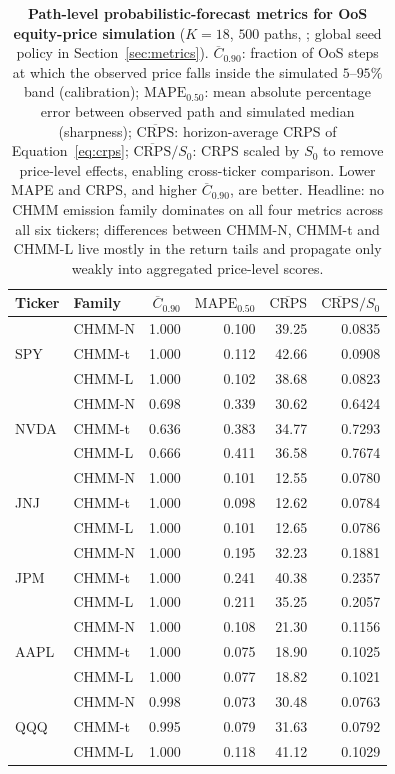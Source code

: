 \begin{table}[t]
\centering
\caption{\textbf{Path-level probabilistic-forecast metrics for OoS equity-price simulation} ($K = 18$, $500$ paths, ; global seed policy in Section~\ref{sec:metrics}). $\overline{C}_{0.90}$: fraction of OoS steps at which the observed price falls inside the simulated $5$--$95\%$ band (calibration); $\text{MAPE}_{0.50}$: mean absolute percentage error between observed path and simulated median (sharpness); $\overline{\text{CRPS}}$: horizon-average CRPS of Equation~\eqref{eq:crps}; $\overline{\text{CRPS}}/S_0$: CRPS scaled by $S_0$ to remove price-level effects, enabling cross-ticker comparison. Lower MAPE and CRPS, and higher $\overline{C}_{0.90}$, are better. Headline: no CHMM emission family dominates on all four metrics across all six tickers; differences between CHMM-N, CHMM-t and CHMM-L live mostly in the return tails and propagate only weakly into aggregated price-level scores.}
\label{tab:price_sim_path_metrics}
\small
\begin{tabular}{ll r r r r}
\toprule
Ticker & Family & $\overline{C}_{0.90}$ & $\text{MAPE}_{0.50}$ & $\overline{\text{CRPS}}$ & $\overline{\text{CRPS}}/S_0$ \\
\midrule
\multirow{3}{*}{SPY}  & CHMM-N & 1.000 & 0.100 & 39.25 & 0.0835 \\
                      & CHMM-t & 1.000 & 0.112 & 42.66 & 0.0908 \\
                      & CHMM-L & 1.000 & 0.102 & 38.68 & 0.0823 \\
\midrule
\multirow{3}{*}{NVDA} & CHMM-N & 0.698 & 0.339 & 30.62 & 0.6424 \\
                      & CHMM-t & 0.636 & 0.383 & 34.77 & 0.7293 \\
                      & CHMM-L & 0.666 & 0.411 & 36.58 & 0.7674 \\
\midrule
\multirow{3}{*}{JNJ}  & CHMM-N & 1.000 & 0.101 & 12.55 & 0.0780 \\
                      & CHMM-t & 1.000 & 0.098 & 12.62 & 0.0784 \\
                      & CHMM-L & 1.000 & 0.101 & 12.65 & 0.0786 \\
\midrule
\multirow{3}{*}{JPM}  & CHMM-N & 1.000 & 0.195 & 32.23 & 0.1881 \\
                      & CHMM-t & 1.000 & 0.241 & 40.38 & 0.2357 \\
                      & CHMM-L & 1.000 & 0.211 & 35.25 & 0.2057 \\
\midrule
\multirow{3}{*}{AAPL} & CHMM-N & 1.000 & 0.108 & 21.30 & 0.1156 \\
                      & CHMM-t & 1.000 & 0.075 & 18.90 & 0.1025 \\
                      & CHMM-L & 1.000 & 0.077 & 18.82 & 0.1021 \\
\midrule
\multirow{3}{*}{QQQ}  & CHMM-N & 0.998 & 0.073 & 30.48 & 0.0763 \\
                      & CHMM-t & 0.995 & 0.079 & 31.63 & 0.0792 \\
                      & CHMM-L & 1.000 & 0.118 & 41.12 & 0.1029 \\
\bottomrule
\end{tabular}
\end{table}

